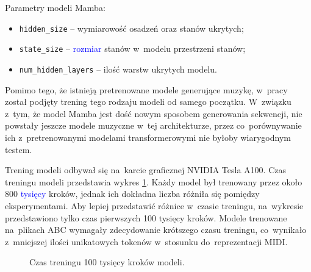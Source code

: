 \documentclass[data-science]{agh-wi} %
\begin{document}
Parametry modeli Mamba:
\begin{itemize}
    \item \texttt{hidden\_size} -- wymiarowość osadzeń oraz stanów ukrytych;
    \item \texttt{state\_size} --  \textcolor{blue}{rozmiar} stanów w~modelu przestrzeni stanów;
    \item \texttt{num\_hidden\_layers} -- ilość warstw ukrytych modelu.
\end{itemize}

Pomimo tego, że istnieją pretrenowane modele generujące muzykę, w~pracy został podjęty trening tego rodzaju modeli od samego początku. W~związku z~tym, że model Mamba jest dość nowym sposobem generowania sekwencji, nie powstały jeszcze modele muzyczne w~tej architekturze, przez co~porównywanie ich z~pretrenowanymi modelami transformerowymi nie byłoby wiarygodnym testem.

Trening modeli odbywał się na~karcie graficznej NVIDIA Tesla A100. Czas treningu modeli przedstawia wykres \ref*{fig:czas_treningu}. Każdy model był trenowany przez około 800 \textcolor{blue}{tysięcy} kroków, jednak ich dokładna liczba różniła się pomiędzy eksperymentami. Aby lepiej przedstawić różnice w~czasie treningu, na~wykresie przedstawiono tylko czas pierwszych 100 tysięcy kroków. Modele trenowane na~plikach ABC wymagały zdecydowanie krótszego czasu treningu, co~wynikało z~mniejszej ilości unikatowych tokenów w~stosunku do~reprezentacji MIDI.

\begin{figure}[ht!]
    \centering
    \caption{Czas treningu 100 tysięcy kroków modeli.}\label{fig:czas_treningu}
\end{figure}
\end{document}
